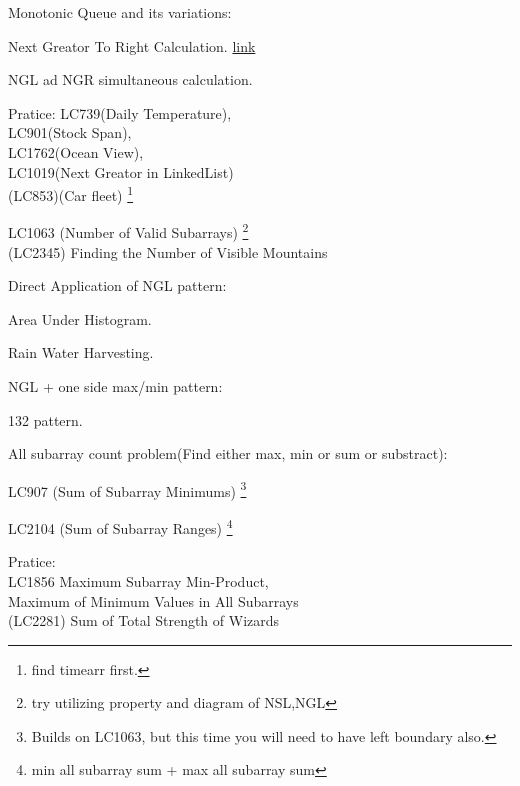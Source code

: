 \begin{exercise}

    Monotonic Queue and its variations:
    \begin{compactenum}
        \item Next Greator To Right Calculation. \href{https://www.geeksforgeeks.org/next-greater-element}{link}
        \item NGL ad NGR simultaneous calculation.
        \item Pratice: \newline LC739(Daily Temperature), \\LC901(Stock Span),\\LC1762(Ocean View),\\LC1019(Next Greator in LinkedList) \\(LC853)(Car fleet) \footnote{find timearr first.}
        \item LC1063 (Number of Valid Subarrays) \footnote{try utilizing property and diagram of NSL,NGL} \\(LC2345) Finding the Number of Visible Mountains
    \end{compactenum}

    Direct Application of NGL pattern:
    \begin{compactenum}
        \item Area Under Histogram.
        \item Rain Water Harvesting.
    \end{compactenum}

    NGL + one side max/min pattern:
    \begin{compactenum}
        \item 132 pattern.
    \end{compactenum}

    All subarray count problem(Find either max, min or sum or substract):
    \begin{compactenum}
        \item LC907 (Sum of Subarray Minimums) \footnote{Builds on LC1063, but this time you will need to have left boundary also.}
        \item LC2104 (Sum of Subarray Ranges) \footnote{min all subarray sum + max all subarray sum}
        \item Pratice:\\
        LC1856 Maximum Subarray Min-Product, \\Maximum of Minimum Values in All Subarrays\\(LC2281) Sum of Total Strength of Wizards
    \end{compactenum}


\end{exercise}
